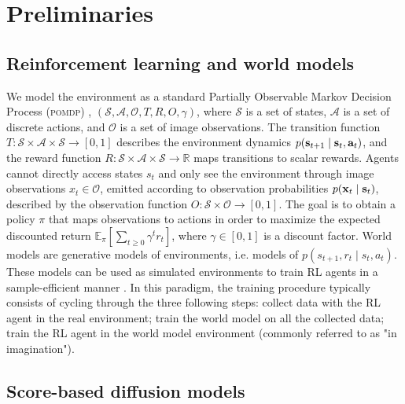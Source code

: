 \vspace{-0.1cm}
\section{Preliminaries}
\label{sec:framework}
\vspace{-0.1cm}

\subsection{Reinforcement learning and world models}
\label{subsec:pomdp_and_wm}

We model the environment as a standard Partially Observable Markov Decision Process (\textsc{pomdp}) \citep{sutton2018reinforcement}, $(\mathcal{S}, \mathcal{A}, \mathcal{O},T,R,O,\gamma)$, where $\mathcal{S}$ is a set of states, $\mathcal{A}$ is a set of discrete actions, and $\mathcal{O}$ is a set of image observations. The transition function $T: \mathcal{S} \times \mathcal{A} \times \mathcal{S} \to [0,1]$ describes the environment dynamics $p(\mathbf{s}_{t+1} \mid \mathbf{s}_t, \mathbf{a}_t)$, and the reward function $R: \mathcal{S} \times \mathcal{A} \times \mathcal{S} \to \mathbb{R}$ maps transitions to scalar rewards. Agents cannot directly access states $s_t$ and only see the environment through image observations $x_t \in \mathcal{O}$, emitted according to observation probabilities $p(\mathbf{x}_t \mid \mathbf{s}_t)$, described by the observation function $O: \mathcal{S} \times \mathcal{O} \to [0,1]$. The goal is to obtain a policy $\pi$ that maps observations to actions in order to maximize the expected discounted return $\mathbb{E}_\pi[\sum_{t \ge 0} \gamma^t r_t]$, where $\gamma \in [0,1]$ is a discount factor. World models \citep{ha2018world} are generative models of environments, i.e. models of $p(s_{t+1},r_{t} \mid s_t, a_t)$. These models can be used as simulated environments to train RL agents \citep{sutton1991dyna} in a sample-efficient manner \citep{wu2023daydreamer}. In this paradigm, the training procedure typically consists of cycling through the three following steps: collect data with the RL agent in the real environment; train the world model on all the collected data; train the RL agent in the world model environment (commonly referred to as "in imagination"). 

\subsection{Score-based diffusion models}
\label{subsec:diffusion}

